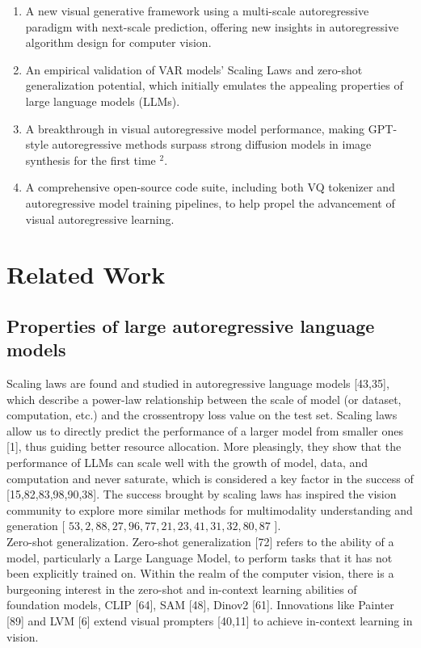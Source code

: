 \documentclass{article}
\begin{document}
\begin{enumerate}
  \item A new visual generative framework using a multi-scale autoregressive paradigm with next-scale prediction, offering new insights in autoregressive algorithm design for computer vision.
  \item An empirical validation of VAR models' Scaling Laws and zero-shot generalization potential, which initially emulates the appealing properties of large language models (LLMs).
  \item A breakthrough in visual autoregressive model performance, making GPT-style autoregressive methods surpass strong diffusion models in image synthesis for the first time ${ }^{2}$.
  \item A comprehensive open-source code suite, including both VQ tokenizer and autoregressive model training pipelines, to help propel the advancement of visual autoregressive learning.
\end{enumerate}

\section*{Related Work}
\subsection*{Properties of large autoregressive language models}
Scaling laws are found and studied in autoregressive language models [43,35], which describe a power-law relationship between the scale of model (or dataset, computation, etc.) and the crossentropy loss value on the test set. Scaling laws allow us to directly predict the performance of a larger model from smaller ones [1], thus guiding better resource allocation. More pleasingly, they show that the performance of LLMs can scale well with the growth of model, data, and computation and never saturate, which is considered a key factor in the success of [15,82,83,98,90,38]. The success brought by scaling laws has inspired the vision community to explore more similar methods for multimodality understanding and generation [ $53,2,88,27,96,77,21,23,41,31,32,80,87$ ].\\[0pt]
Zero-shot generalization. Zero-shot generalization [72] refers to the ability of a model, particularly a Large Language Model, to perform tasks that it has not been explicitly trained on. Within the realm of the computer vision, there is a burgeoning interest in the zero-shot and in-context learning abilities of foundation models, CLIP [64], SAM [48], Dinov2 [61]. Innovations like Painter [89] and LVM [6] extend visual prompters [40,11] to achieve in-context learning in vision.
\end{document}
